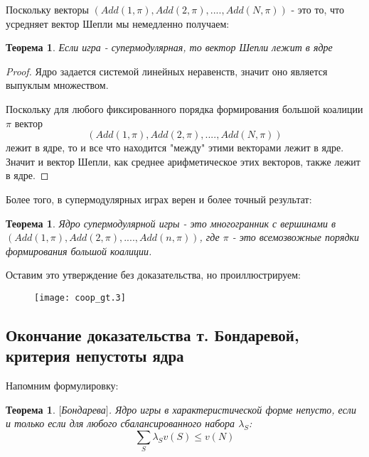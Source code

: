 \documentclass[pdftex,12pt,a4paper]{article}
\numberwithin{equation}{page} %
\newtheorem{theorem}[equation]{Теорема} %
\theoremstyle{definition} %
\theoremstyle{definition}
\theoremstyle{definition}
\begin{document}
Поскольку векторы $(Add(1,\pi),Add(2,\pi),....,Add(N,\pi))$ - это то, что усредняет вектор Шепли мы немедленно получаем:


\begin{theorem}
Если игра - супермодулярная, то вектор Шепли лежит в ядре
\end{theorem}
\begin{proof}
Ядро задается системой линейных неравенств, значит оно является выпуклым множеством. 

Поскольку для любого фиксированного порядка формирования большой коалиции $\pi$ вектор 
\begin{equation}
(Add(1,\pi),Add(2,\pi),....,Add(N,\pi))
\end{equation}
лежит в ядре, то и все что находится "между" этими векторами лежит в ядре. Значит и вектор Шепли, как среднее арифметическое этих векторов, также лежит в ядре.
\end{proof}

Более того, в супермодулярных играх верен и более точный результат:

\begin{theorem}
Ядро супермодулярной игры - это многогранник с вершинами в $(Add(1,\pi),Add(2,\pi),....,Add(n,\pi))$, где $\pi$ - это всемозвожные порядки формирования большой коалиции.
\end{theorem}

Оставим это утверждение без доказательства, но проиллюстрируем:


\begin{figure}[htbp]
    \texttt{[image: coop\_gt.3]}
\end{figure}




\subsection{Окончание доказательства т. Бондаревой, критерия непустоты ядра}

Напомним формулировку:
\begin{theorem} $[$Бондарева$]$.
Ядро игры в характеристической форме непусто, если и только если для любого сбалансированного набора $\lambda_{S}$:
\begin{equation}
\label{balanced_game}
\sum_{S} \lambda_{S}v(S)\leq v(N)
\end{equation}
\end{theorem}
\end{document}
